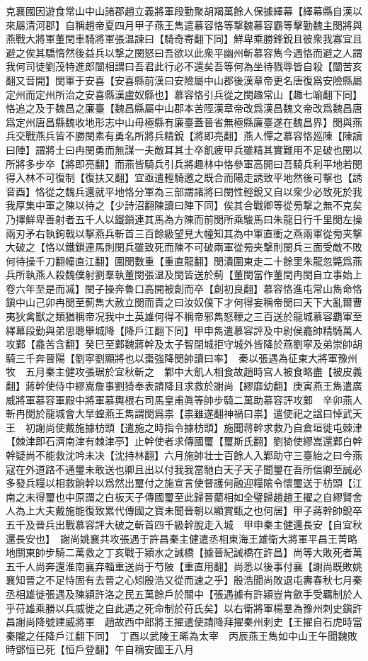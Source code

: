 克襄國因遊食常山中山諸郡趙立義將軍段勤聚胡羯萬餘人保據繹幕【繹幕縣自漢以來屬清河郡】自稱趙帝夏四月甲子燕王雋遣慕容恪等撃魏慕容霸等擊勤魏主閔將與燕戰大將軍董閏車騎將軍張温諫曰【騎奇寄翻下同】鮮卑乘勝鋒銳且彼衆我寡宜且避之俟其驕惰然後益兵以撃之閔怒曰吾欲以此衆平幽州斬慕容雋今遇恪而避之人謂我何司徒劉茂特進郎闓相謂曰吾君此行必不還矣吾等何為坐待戮辱皆自殺【闓苦亥翻又音開】閔軍于安喜【安喜縣前漢曰安險屬中山郡後漢章帝更名唐復爲安險縣屬定州而定州所治之安喜縣漢盧奴縣也】慕容恪引兵從之閔趣常山【趣七喻翻下同】恪追之及于魏昌之廉臺【魏昌縣屬中山郡本苦陘漢章帝改爲漢昌魏文帝改爲魏昌唐爲定州唐昌縣魏收地形志中山毋極縣有廉臺蓋晉省無極縣廉臺遂在魏昌界】閔與燕兵交戰燕兵皆不勝閔素有勇名所將兵精銳【將即亮翻】燕人憚之慕容恪廵陳【陳讀曰陣】謂將士曰冉閔勇而無謀一夫敵耳其士卒飢疲甲兵雖精其實難用不足破也閔以所將多步卒【將即亮翻】而燕皆騎兵引兵將趣林中恪參軍高開曰吾騎兵利平地若閔得入林不可復制【復扶又翻】宜亟遣輕騎邀之既合而陽走誘致平地然後可撃也【誘音酉】恪從之魏兵還就平地恪分軍為三部謂諸將曰閔性輕銳又自以衆少必致死於我我厚集中軍之陳以待之【少詩沼翻陳讀曰陣下同】俟其合戰卿等從㫄撃之無不克矣乃擇鮮卑善射者五千人以鐵鎻連其馬為方陳而前閔所乘駿馬曰朱龍日行千里閔左操兩刃矛右執鉤戟以撃燕兵斬首三百餘級望見大幢知其為中軍直衝之燕兩軍從㫄夹撃大破之【恪以鐵鎻連馬則閔兵雖致死而陳不可破兩軍從㫄夹撃則閔兵三面受敵不敗何待操千刀翻幢直江翻】圍閔數重【重直龍翻】閔潰圍東走二十餘里朱龍忽斃爲燕兵所執燕人殺魏僕射劉羣執董閔張温及閔皆送於薊【董閔當作董閏冉閔自立事始上卷六年至是而㓕】閔子操奔魯口高開被創而卒【創初良翻】慕容恪進屯常山雋命恪鎭中山己卯冉閔至薊雋大赦立閔而責之曰汝奴僕下才何得妄稱帝閔曰天下大亂爾曹夷狄禽獸之類猶稱帝况我中土英雄何得不稱帝邪雋怒鞭之三百送於龍城慕容覇軍至繹幕段勤與弟思聰舉城降【降戶江翻下同】甲申雋遣慕容評及中尉侯龕帥精騎萬人攻鄴【龕苦含翻】癸巳至鄴魏蔣幹及太子智閉城拒守城外皆降於燕劉寜及弟崇帥胡騎三千奔晉陽【劉寜劉顯將也以棗強降閔帥讀曰率】　秦以張遇為征東大將軍豫州牧　五月秦主健攻張琚於宜秋斬之　鄴中大飢人相食故趙時宫人被食略盡【被皮義翻】蔣幹使侍中繆嵩詹事劉猗奉表請降且求救於謝尚【繆靡幼翻】庚寅燕王雋遣廣威將軍慕容軍殿中將軍慕輿根右司馬皇甫眞等帥步騎二萬助慕容評攻鄴　辛卯燕人斬冉閔於龍城會大旱蝗燕王雋謂閔爲祟【祟雖遂翻神禍曰祟】遣使祀之諡曰悼武天王　初謝尚使戴施據枋頭【遣施之時指令據枋頭】施聞蒋幹求救乃自倉垣徙屯棘津【棘津即石濟南津有棘津亭】止幹使者求傳國璽【璽斯氏翻】劉猗使繆嵩還鄴白幹幹疑尚不能救沈吟未决【沈持林翻】六月施帥壮士百餘人入鄴助守三臺紿之曰今燕寇在外道路不通璽未敢送也卿且出以付我我當馳白天子天子聞璽在吾所信卿至誠必多發兵糧以相救餉幹以爲然出璽付之施宣言使督護何融迎糧隂令懷璽送于枋頭【江南之未得璽也中原謂之白板天子傳國璽至此歸晉藺相如全璧歸趙趙王擢之自繆賢舍人為上大夫戴施能復致累代傳國之寶未聞晉朝以顯賞甄之也何居】甲子蔣幹帥銳卒五千及晉兵出戰慕容評大破之斬首四千級幹脫走入城　甲申秦主健還長安【自宜秋還長安也】　謝尚姚襄共攻張遇于許昌秦主健遣丞相東海王雄衛大將軍平昌王菁略地關東帥步騎二萬救之丁亥戰于潁水之誡橋【據晉紀誡橋在許昌】尚等大敗死者萬五千人尚奔還淮南襄弃輜重送尚于芍陂【重直用翻】尚悉以後事付襄【謝尚既敗姚襄知晉之不足恃固有去晉之心矧殷浩又從而速之乎】殷浩聞尚敗退屯夀春秋七月秦丞相雄徙張遇及陳潁許洛之民五萬餘戶於關中【張遇據有許潁豈肯歛手受羈制於人乎苻雄乘勝以兵威徙之自此遇之死命制於苻氏矣】以右衛將軍楊羣為豫州刺史鎭許昌謝尚降號建威將軍　趙故西中郎將王擢遣使請降拜擢秦州刺史【王擢自石虎時當秦隴之任降戶江翻下同】　丁酉以武陵王晞為太宰　丙辰燕王雋如中山王午聞魏敗時鄧恒已死【恒戶登翻】午自稱安國王八月

